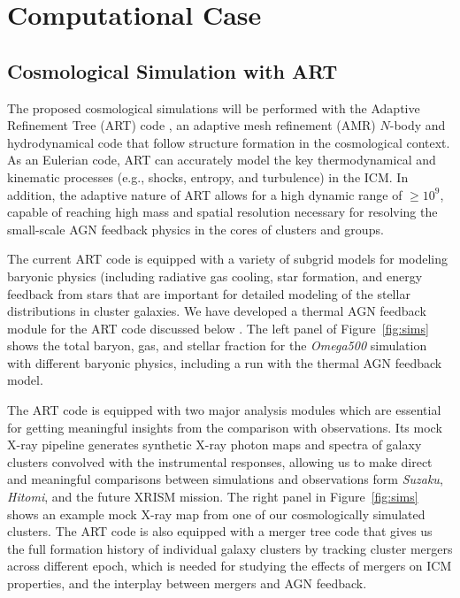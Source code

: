 \documentclass[letterpaper,11pt]{article}
\begin{document}

\section{Computational Case}
\subsection{Cosmological Simulation with ART}\label{sec:art}

The proposed cosmological simulations will be performed with the Adaptive Refinement Tree ({ART}) code \citep{kra99,kra02,rudd_etal08}, an adaptive mesh refinement (AMR) $N$-body and hydrodynamical code that follow structure formation in the cosmological context. 
As an Eulerian code, ART can accurately model the key thermodynamical and kinematic processes (e.g., shocks, entropy, and turbulence) in the ICM. In addition, the adaptive nature of ART allows for a high dynamic range of $\geq 10^9$, capable of reaching high mass and spatial resolution necessary for resolving the small-scale AGN feedback physics in the cores of clusters and groups. 

The current {ART} code is equipped with a variety of subgrid models for modeling baryonic physics (including radiative gas cooling, star formation, and energy feedback from stars that are important for detailed modeling of the stellar distributions in cluster galaxies. We have developed a thermal AGN feedback module for the {ART} code discussed below \citep[also see][for the first implementation of AGN feedback into the {ART} code]{nagai_etal13}. The left panel of Figure~\ref{fig:sims} shows the total baryon, gas, and stellar fraction for the {\em Omega500} simulation \citep{nelson_etal14} with different baryonic physics, including a run with the thermal AGN feedback model. 

The ART code is equipped with two major analysis modules which are essential for getting meaningful insights from the comparison with observations. Its mock X-ray pipeline generates synthetic X-ray photon maps and spectra of galaxy clusters convolved with the instrumental responses,  allowing us to make direct and meaningful comparisons between simulations and observations form {\em Suzaku}, {\em Hitomi}, and the future XRISM mission.  The right panel in Figure~\ref{fig:sims} shows an example mock X-ray map from one of our cosmologically simulated clusters.  The ART code is also equipped with a merger tree code that gives us the full formation history of individual galaxy clusters by tracking cluster mergers across different epoch, which is needed for studying the effects of mergers on ICM properties, and the interplay between mergers and AGN feedback. 
\end{document}
